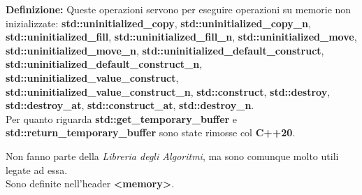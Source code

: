 \textsf{\small \textbf{Definizione: } Queste operazioni servono per eseguire operazioni su memorie non inizializzate: \textbf{std::uninitialized\_copy}, \textbf{std::uninitialized\_copy\_n}, \textbf{std::uninitialized\_fill}, \textbf{std::uninitialized\_fill\_n}, \textbf{std::uninitialized\_move}, \textbf{std::uninitialized\_move\_n}, \textbf{std::uninitialized\_default\_construct}, \textbf{std::uninitialized\_default\_construct\_n}, \textbf{std::uninitialized\_value\_construct}, \textbf{std::uninitialized\_value\_construct\_n}, \textbf{std::construct}, \textbf{std::destroy}, \textbf{std::destroy\_at}, \textbf{std::construct\_at}, \textbf{std::destroy\_n}.} \\

\textsf{\small Per quanto riguarda \textbf{std::get\_temporary\_buffer} e \textbf{std::return\_temporary\_buffer} sono state rimosse col \textbf{C++20}.} \break

\textsf{\small Non fanno parte della \emph{Libreria degli Algoritmi}, ma sono comunque molto utili legate ad essa.} \\ %

\textsf{\small Sono definite nell'header \textbf{<memory>}.} \\

